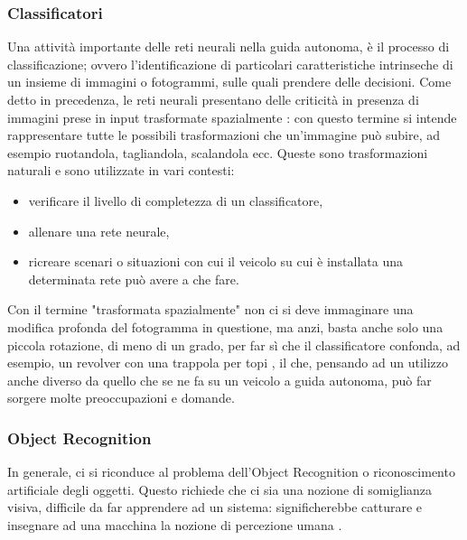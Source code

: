 \documentclass[14pt]{extarticle}
\begin{document}
\subsubsection{Classificatori}
Una attività importante delle reti neurali nella guida autonoma, è il processo di classificazione; ovvero l'identificazione di particolari caratteristiche  intrinseche di un insieme di immagini o fotogrammi, sulle quali prendere delle decisioni.
Come detto in precedenza, le reti neurali presentano delle criticità in presenza di immagini prese in input trasformate spazialmente \cite{engstrom2019exploring}: con questo termine si intende rappresentare tutte le possibili trasformazioni
che un'immagine può subire, ad esempio ruotandola, tagliandola, scalandola ecc. Queste sono trasformazioni naturali e sono utilizzate in vari
contesti:
	\begin{itemize}
	\item verificare il livello di completezza di un classificatore,
	\item allenare una rete neurale,
	\item ricreare scenari o situazioni con cui il veicolo su cui è installata una
	determinata rete può avere a che fare.
	\end{itemize}

Con il termine "trasformata spazialmente" non ci si deve immaginare
una modifica profonda del fotogramma in questione, ma anzi, basta
anche solo una piccola rotazione, di meno di un grado, per far sì che il
classificatore confonda, ad esempio, un revolver con una trappola per topi
\cite{engstrom2019exploring}, il che, pensando ad un utilizzo anche diverso da quello che se ne fa
su un veicolo a guida autonoma, può far sorgere molte preoccupazioni e
domande.%

\subsubsection{Object Recognition}
In generale, ci si riconduce al problema dell'Object Recognition o riconoscimento artificiale degli oggetti. Questo richiede che ci sia una nozione
di somiglianza visiva, difficile da far apprendere ad un sistema: significherebbe catturare e insegnare ad una macchina la nozione di percezione
umana \cite{engstrom2019exploring}.
\end{document}
